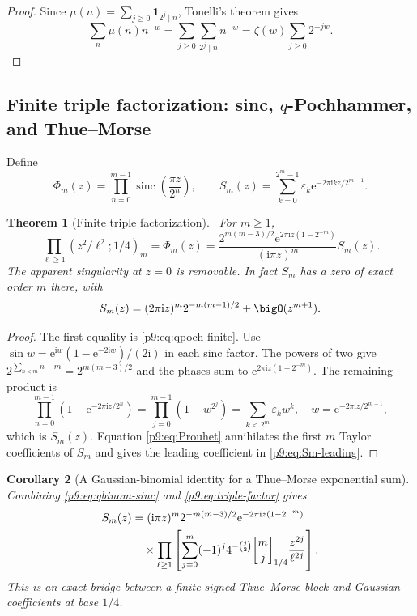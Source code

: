 \documentclass[11pt]{article}
\numberwithin{equation}{section}
\newtheorem{theorem}{Theorem}[section]
\newtheorem{corollary}[theorem]{Corollary}
\theoremstyle{definition}
\theoremstyle{remark}
\newcommand{\sinc}{\operatorname{sinc}}
\newcommand{\e}{\mathrm e}
\newcommand{\ii}{\mathrm i}
\newcommand{\qbinom}[3]{\genfrac{[}{]}{0pt}{}{#1}{#2}_{#3}}
\begin{document}
\begin{proof}
Since $\mu(n)=\sum_{j\ge0}\mathbf1_{2^j\mid n}$, Tonelli's theorem gives
\[
 \sum_n\mu(n)n^{-w}=\sum_{j\ge0}\sum_{2^j\mid n}n^{-w}
 =\zeta(w)\sum_{j\ge0}2^{-jw}.
\]
\end{proof}

\subsection{Finite triple factorization: sinc, $q$-Pochhammer, and Thue--Morse}
Define
\begin{equation}
 \Phi_m(z)=\prod_{n=0}^{m-1}\sinc\!\left(\frac{\pi z}{2^n}\right),
 \qquad
 S_m(z)=\sum_{k=0}^{2^m-1}\varepsilon_k
 \e^{-2\pi\ii kz/2^{m-1}}.                                \label{p9:eq:Phi-m-Sm}
\end{equation}

\begin{theorem}[Finite triple factorization]\label{p9:thm:triple-factor}
\statusN\ For $m\ge1$,
\begin{equation}
 \boxed{
 \prod_{\ell\ge1}(z^2/\ell^2;1/4)_m
 =\Phi_m(z)
 =\frac{2^{m(m-3)/2}\e^{2\pi\ii z(1-2^{-m})}}{(\ii\pi z)^m}
 S_m(z).}                                                   \label{p9:eq:triple-factor}
\end{equation}
The apparent singularity at $z=0$ is removable.  In fact $S_m$ has a zero of exact order
$m$ there, with
\begin{equation}
 S_m(z)=(2\pi\ii z)^m2^{-m(m-1)/2}+\bigO(z^{m+1}).         \label{p9:eq:Sm-leading}
\end{equation}
\end{theorem}

\begin{proof}
The first equality is \eqref{p9:eq:qpoch-finite}.  Use
$\sin w=\e^{\ii w}(1-\e^{-2\ii w})/(2\ii)$ in each sinc factor.  The powers of two give
$2^{\sum_{n<m}n-m}=2^{m(m-3)/2}$ and the phases sum to
$\e^{2\pi\ii z(1-2^{-m})}$.  The remaining product is
\[
 \prod_{n=0}^{m-1}(1-\e^{-2\pi\ii z/2^n})
 =\prod_{j=0}^{m-1}(1-w^{2^j})=\sum_{k<2^m}\varepsilon_kw^k,
 \quad w=\e^{-2\pi\ii z/2^{m-1}},
\]
which is $S_m(z)$.  Equation \eqref{p9:eq:Prouhet} annihilates the first $m$ Taylor
coefficients of $S_m$ and gives the leading coefficient in \eqref{p9:eq:Sm-leading}.
\end{proof}

\begin{corollary}[A Gaussian-binomial identity for a Thue--Morse exponential sum]
Combining \eqref{p9:eq:qbinom-sinc} and \eqref{p9:eq:triple-factor} gives
\begin{align}
 S_m(z)
 &=(\ii\pi z)^m2^{-m(m-3)/2}\e^{-2\pi\ii z(1-2^{-m})} \notag\\
 &\quad\times
 \prod_{\ell\ge1}
 \left[
  \sum_{j=0}^{m}(-1)^j4^{-\binom j2}\qbinom mj{1/4}
  \frac{z^{2j}}{\ell^{2j}}
 \right].                                                  \label{p9:eq:TM-qbinom}
\end{align}
This is an exact bridge between a finite signed Thue--Morse block and Gaussian
coefficients at base $1/4$.
\end{corollary}
\end{document}
